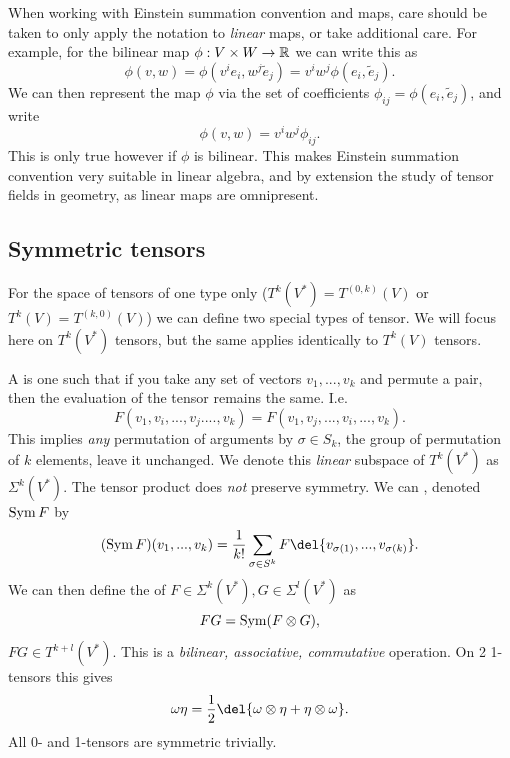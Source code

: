 When working with Einstein summation convention and maps, care should be taken to only apply the notation to \emph{linear} maps, or take additional care.
For example, for the bilinear map \(\phi: V\times W\to \mathbb{R}\) we can write this as
\[
	\phi(v, w) = \phi(v^i e_i, w^j \tilde{e}_j) = v^i w^j \phi(e_i, \tilde{e}_j).
\]
We can then represent the map \(\phi\) via the set of coefficients \(\phi_{ij} = \phi(e_i, \tilde{e}_j)\), and write
\[
	\phi(v, w) = v^i w^j \phi_{ij}.
\]
This is only true however if \(\phi\) is bilinear.
This makes Einstein summation convention very suitable in linear algebra, and by extension the study of tensor fields in geometry, as linear maps are omnipresent. 

\subsection{Symmetric tensors}
\label{sec:sym_alt}
For the space of tensors of one type only (\(T^k(V^*) = T^{(0,k)}(V)\) or \(T^k(V) = T^{(k, 0)}(V)\)) we can define two special types of tensor.
We will focus here on \(T^k(V^*)\) tensors, but the same applies identically to \(T^k(V)\) tensors.

A  is one such that if you take any set of vectors \(v_1, .
.., v_k\) and permute a pair, then the evaluation of the tensor remains the same.
I.e. \[F(v_1, v_i, .
	.., v_j ...., v_k) = F(v_1,v_j, ..., v_i, ..., v_k).\]
This implies \emph{any} permutation of arguments by \(\sigma \in S_k\), the group of permutation of \(k\) elements, leave it unchanged.
We denote this \emph{linear} subspace of \(T^k(V^*)\) as \(\Sigma^k(V^*)\).
The tensor product does \emph{not} preserve symmetry.
We can , denoted \(\operatorname{Sym} F\) by \[(\sym F) (v_1, .
	.., v_k)  = \frac{1}{k!}\sum_{\sigma \in S^k}
	F\del{v_{\sigma(1)}, .
		.., v_{\sigma(k)}}.\]
We can then define the  of \(F\in \Sigma^k(V^*), G\in \Sigma^l(V^*)\) as \[ FG = \operatorname{Sym} (F\otimes G) ,\] \(FG \in T^{k+l}(V^*)\).
This is a \emph{bilinear, associative, commutative} operation.
On 2 1-tensors this gives \[\omega\eta = \frac{1}{2}\del{\omega\otimes \eta + \eta\otimes \omega}.\]
All 0- and 1-tensors are symmetric trivially.

